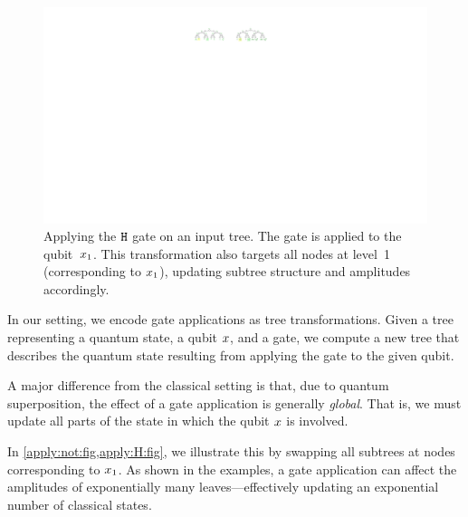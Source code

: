 \begin{figure}[ht] 
    \centering
    \includegraphics[scale=0.9]{Figures/Trees/ApplyH} 
    \caption{Applying the $\mathtt{H}$ gate on an input tree. 
    The gate is applied to the qubit~$x_1$.
    This transformation also targets all nodes at level~1 (corresponding to $x_1$), updating subtree structure and amplitudes accordingly.}
    \label{apply:H:fig}
\end{figure}

In our setting, we encode gate applications as tree transformations.
Given a tree representing a quantum state, a qubit $x$, and a gate, we compute a new tree that describes the quantum state resulting from applying the gate to the given qubit.

A major difference from the classical setting is that, due to quantum superposition, the effect of a gate application is generally \emph{global}.
That is, we must update all parts of the state in which the qubit $x$ is involved.

In \cref{apply:not:fig,apply:H:fig}, we illustrate this by swapping all subtrees at nodes corresponding to $x_1$.
As shown in the examples, a gate application can affect the amplitudes of exponentially many leaves—effectively updating an exponential number of classical states.
